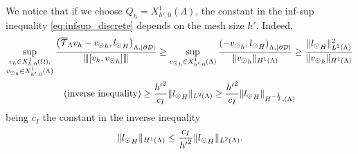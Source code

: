 \begin{remark}
We notice that if we choose $Q_h=X_{h',0}^1(\Lambda)$, the constant in the inf-sup inequality  \eqref{eq:infsup_discrete} depends on the mesh size $h'$. Indeed,
\begin{multline}
\sup_{\substack{v_h \in X_{h,0}^1(\Omega),\\ {v_{\odot}}_h \in X_{h',0}^1(\Lambda)}} \frac{\left({\overline{\mathcal{T}}_\Lambda} v_h - {v_{\odot}}_h, {l_{\odot}} _H\right)_{\Lambda, |\partial\mathcal{D}|}}{{\left\vert\kern-0.25ex\left\vert\kern-0.25ex\left\vert [v_h, {v_{\odot}}_h] \right\vert\kern-0.25ex\right\vert\kern-0.25ex\right\vert}}
\geq \sup_{\substack{{v_{\odot}}_h \in X_{h',0}^1(\Lambda)}} \frac{\left(- {v_{\odot}}_h, {l_{\odot}} _H\right)_{\Lambda, |\partial\mathcal{D}|}}{\|{v_{\odot}}_h\|_{H^1(\Lambda)}}
\geq \frac{{\|l_{\odot}} _H\|^2_{L^2(\Lambda)}}{\|{v_{\odot}}_h\|_{H^1(\Lambda)}} \\
( \text{inverse inequality} )\geq \frac{{h'}^2}{c_I} \|{l_{\odot}}_H\|_{L^2(\Lambda)}
\geq  \frac{{h'}^2}{c_I} \|{l_{\odot}}_H\|_{H^{-\frac 12},(\Lambda)}
\end{multline}
being $c_I$ the constant in the inverse inequality
\begin{equation*}
\|{l_{\odot}}_H\|_{H^1(\Lambda)} \leq \frac{c_I} {{h'}^2} \|{l_{\odot}}_H\|_{L^2(\Lambda)}. 
\end{equation*}
\end{remark}

